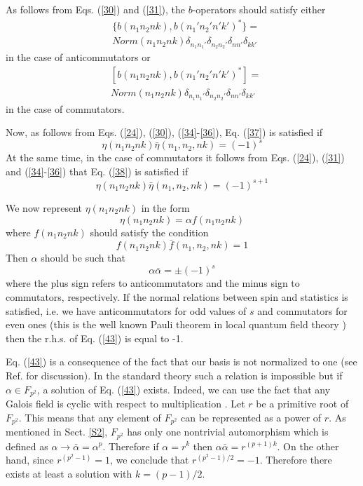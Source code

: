 \documentclass[a4paper,12pt]{article}%
\begin{document}
As follows from Eqs. 
(\ref{30}) and (\ref{31}), the $b$-operators should 
satisfy either 
\begin{eqnarray}
&\{b(n_1n_2nk),b(n_1'n_2'n'k')^*\}=\nonumber\\
&Norm(n_1n_2nk)
\delta_{n_1n_1'}\delta_{n_2n_2'}\delta_{nn'}\delta_{kk'}
\label{37}
\end{eqnarray}
in the case of anticommutators or
\begin{eqnarray}
&[b(n_1n_2nk),b(n_1'n_2'n'k')^*]=\nonumber\\
&Norm(n_1n_2nk)
\delta_{n_1n_1'}\delta_{n_2n_2'}\delta_{nn'}\delta_{kk'}
\label{38}
\end{eqnarray}
in the case of commutators.

Now, as follows from Eqs. (\ref{24}),
(\ref{30}), (\ref{34}-\ref{36}), 
Eq. (\ref{37}) is satisfied if
\begin{equation}
\eta(n_1n_2nk) {\bar \eta}(n_1,n_2,nk)=(-1)^s
\label{39}
\end{equation}
At the same time, in the case of commutators it 
follows from Eqs. (\ref{24}), (\ref{31}) and 
(\ref{34}-\ref{36}) that Eq. (\ref{38}) is satisfied if
\begin{equation}
\eta(n_1n_2nk) {\bar \eta}(n_1,n_2,nk)=(-1)^{s+1}
\label{40}
\end{equation}

We now represent $\eta(n_1n_2nk)$ in the form 
\begin{equation}
\eta(n_1n_2nk)=\alpha f(n_1n_2nk)
\label{41}
\end{equation}
where $f(n_1n_2nk)$ should satisfy the condition
\begin{equation}
f(n_1n_2nk) {\bar f}(n_1,n_2,nk)=1
\label{42}
\end{equation}
Then $\alpha$ should be such that 
\begin{equation}
\alpha {\bar \alpha}=\pm (-1)^s
\label{43}
\end{equation}
where the plus sign refers to anticommutators and the minus
sign to commutators, respectively.
If the normal relations between spin and
statistics is satisfied, i.e. we have anticommutators for
odd values of $s$ and commutators for even ones (this is the 
well known Pauli theorem in local quantum field theory 
\cite{Pauli}) then the r.h.s. 
of Eq. (\ref{43}) is equal to -1. 

Eq. (\ref{43}) is a consequence of the fact that our basis is
not normalized to one (see Ref. \cite{lev2} for discussion).
In the standard theory such a relation is 
impossible but if $\alpha\in F_{p^2}$, a solution of Eq. (\ref{43}) 
exists. Indeed, we can use the fact that any Galois field is 
cyclic with respect to multiplication \cite{VDW,IR}. 
Let $r$ be a primitive root of $F_{p^2}$. This means that any
element of $F_{p^2}$ can be represented as a power of $r$. 
As mentioned in Sect. \ref{S2}, $F_{p^2}$ has only one
nontrivial automorphism which is defined as 
$\alpha\rightarrow {\bar \alpha}=\alpha^p$. 
Therefore if $\alpha =r^k$ then $\alpha{\bar \alpha}=
r^{(p+1)k}$. On the other hand, since $r^{(p^2-1)}=1$, we
conclude that $r^{(p^2-1)/2}=-1$. Therefore there exists at
least a solution with $k=(p-1)/2$. 
\end{document}
